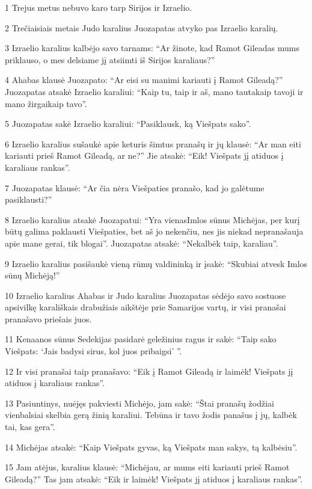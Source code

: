 \par 1 Trejus metus nebuvo karo tarp Sirijos ir Izraelio. 
\par 2 Trečiaisiais metais Judo karalius Juozapatas atvyko pas Izraelio karalių. 
\par 3 Izraelio karalius kalbėjo savo tarnams: “Ar žinote, kad Ramot Gileadas mums priklauso, o mes delsiame jį atsiimti iš Sirijos karaliaus?” 
\par 4 Ahabas klausė Juozapato: “Ar eisi su manimi kariauti į Ramot Gileadą?” Juozapatas atsakė Izraelio karaliui: “Kaip tu, taip ir aš, mano tauta­kaip tavoji ir mano žirgai­kaip tavo”. 
\par 5 Juozapatas sakė Izraelio karaliui: “Pasiklausk, ką Viešpats sako”. 
\par 6 Izraelio karalius sušaukė apie keturis šimtus pranašų ir jų klausė: “Ar man eiti kariauti prieš Ramot Gileadą, ar ne?” Jie atsakė: “Eik! Viešpats jį atiduos į karaliaus rankas”. 
\par 7 Juozapatas klausė: “Ar čia nėra Viešpaties pranašo, kad jo galėtume pasiklausti?” 
\par 8 Izraelio karalius atsakė Juozapatui: “Yra vienas­Imlos sūnus Michėjas, per kurį būtų galima paklausti Viešpaties, bet aš jo nekenčiu, nes jis niekad nepranašauja apie mane gerai, tik blogai”. Juozapatas atsakė: “Nekalbėk taip, karaliau”. 
\par 9 Izraelio karalius pasišaukė vieną rūmų valdininką ir įsakė: “Skubiai atvesk Imlos sūnų Michėją!” 
\par 10 Izraelio karalius Ahabas ir Judo karalius Juozapatas sėdėjo savo sostuose apsivilkę karališkais drabužiais aikštėje prie Samarijos vartų, ir visi pranašai pranašavo priešais juos. 
\par 11 Kenaanos sūnus Sedekijas pasidarė geležinius ragus ir sakė: “Taip sako Viešpats: ‘Jais badysi sirus, kol juos pribaigsi’ ”. 
\par 12 Ir visi pranašai taip pranašavo: “Eik į Ramot Gileadą ir laimėk! Viešpats jį atiduos į karaliaus rankas”. 
\par 13 Pasiuntinys, nuėjęs pakviesti Michėjo, jam sakė: “Štai pranašų žodžiai vienbalsiai skelbia gerą žinią karaliui. Tebūna ir tavo žodis panašus į jų, kalbėk tai, kas gera”. 
\par 14 Michėjas atsakė: “Kaip Viešpats gyvas, ką Viešpats man sakys, tą kalbėsiu”. 
\par 15 Jam atėjus, karalius klausė: “Michėjau, ar mums eiti kariauti prieš Ramot Gileadą?” Tas jam atsakė: “Eik ir laimėk! Viešpats jį atiduos į karaliaus rankas”. 
